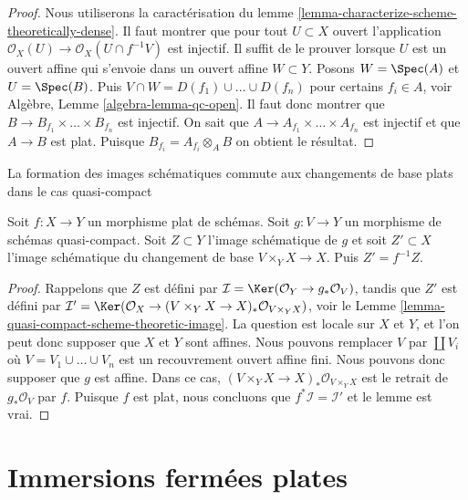 \begin{proof}
Nous utiliserons la caractérisation
du lemme \ref{lemma-characterize-scheme-theoretically-dense}. Il faut montrer
que pour tout $U \subset X$ ouvert l'application
$\mathcal{O}_X(U) \to \mathcal{O}_X(U \cap f^{-1}V)$ est injectif. Il suffit
de le prouver lorsque $U$ est un ouvert affine
qui s'envoie dans un ouvert affine $W \subset Y$.
Posons $W = \Spec(A)$ et $U = \Spec(B)$. Puis
$V \cap W = D(f_1) \cup \ldots \cup D(f_n)$
pour certains $f_i \in A$, voir
Algèbre, Lemme \ref{algebra-lemma-qc-open}.
Il faut donc montrer que $B \to B_{f_1} \times \ldots \times B_{f_n}$
est injectif. On sait que $A \to A_{f_1} \times \ldots \times A_{f_n}$ est injectif
et que $A \to B$ est plat. Puisque $B_{f_i} = A_{f_i} \otimes_A B$ on obtient le résultat.
\end{proof}

\begin{lemma}
\label{lemma-flat-base-change-scheme-theoretic-image}
\begin{slogan}
La formation des images schématiques commute aux changements de base plats
dans le cas quasi-compact
\end{slogan}
Soit $f : X \to Y$ un morphisme plat de schémas. Soit $g : V \to Y$ un
morphisme de schémas quasi-compact. Soit $Z \subset Y$ l'image schématique
de $g$ et soit $Z' \subset X$ l'image schématique du changement
de base $V \times_Y X \to X$. Puis $Z' = f^{-1}Z$.
\end{lemma}

\begin{proof}
Rappelons que $Z$ est défini par
$\mathcal{I} = \Ker(\mathcal{O}_Y \to g_*\mathcal{O}_V)$, tandis que $Z'$ est défini par
$\mathcal{I}' = \Ker(\mathcal{O}_X \to
(V \times_Y X \to X)_*\mathcal{O}_{V \times_Y X})$,
voir le Lemme \ref{lemma-quasi-compact-scheme-theoretic-image}. La question est locale
sur $X$ et $Y$, et l'on peut donc supposer
que $X$ et $Y$ sont affines. Nous pouvons remplacer $V$
par $\coprod V_i$ où $V = V_1 \cup \ldots \cup V_n$ est un recouvrement
ouvert affine fini. Nous pouvons donc supposer
que $g$ est affine. Dans ce cas,
$(V \times_Y X \to X)_*\mathcal{O}_{V \times_Y X}$ est le retrait de $g_*\mathcal{O}_V$ par $f$.
Puisque $f$ est plat, nous concluons que
$f^*\mathcal{I} = \mathcal{I}'$ et le lemme est vrai.
\end{proof}




\section{Immersions fermées plates}
\label{section-flat-closed-immersions}

